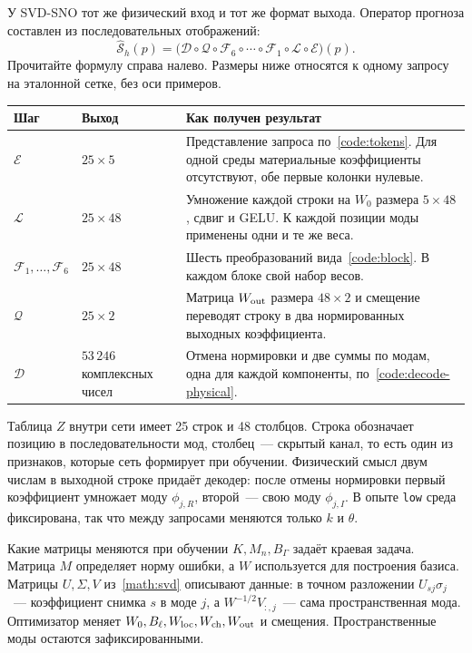 У SVD-SNO тот же физический вход и тот же формат выхода. Оператор прогноза
составлен из последовательных отображений:
\begin{equation}
 \widehat{\mathcal S}_h(p)=
 \bigl(\mathcal D\circ\mathcal Q\circ\mathcal F_6\circ\cdots
       \circ\mathcal F_1\circ\mathcal L\circ\mathcal E\bigr)(p).
 \label{code:whole-operator}
\end{equation}
Прочитайте формулу справа налево. Размеры ниже относятся к одному запросу
на эталонной сетке, без оси примеров.

\begin{center}
\renewcommand{\arraystretch}{1.17}
\begin{tabularx}{\linewidth}{@{}l l X@{}}
\toprule
Шаг & Выход & Как получен результат \\ \midrule
$\mathcal E$ & $25\times5$ & Представление запроса по~\eqref{code:tokens}.
Для одной среды материальные коэффициенты отсутствуют, обе первые колонки нулевые.\\
$\mathcal L$ & $25\times48$ & Умножение каждой строки на $W_0$ размера $5\times48$,
сдвиг и GELU. К каждой позиции моды применены одни и те же веса.\\
$\mathcal F_1,\ldots,\mathcal F_6$ & $25\times48$ & Шесть преобразований
вида~\eqref{code:block}. В каждом блоке свой набор весов.\\
$\mathcal Q$ & $25\times2$ & Матрица $W_{\rm out}$ размера $48\times2$ и смещение
переводят строку в два нормированных выходных коэффициента.\\
$\mathcal D$ & $53\,246$ комплексных чисел & Отмена нормировки и две суммы
по модам, одна для каждой компоненты, по~\eqref{code:decode-physical}.\\
\bottomrule
\end{tabularx}
\end{center}

Таблица $Z$ внутри сети имеет 25 строк и 48 столбцов. Строка обозначает
позицию в последовательности мод, столбец~--- скрытый канал, то есть один
из признаков, которые сеть формирует при обучении. Физический смысл двум числам в выходной строке придаёт декодер: после отмены
нормировки первый коэффициент умножает моду $\phi_{j,R}$, второй~---
свою моду $\phi_{j,I}$. В опыте \texttt{low} среда фиксирована,
так что между запросами меняются только $k$ и $\theta$.

\begin{idea}{Какие матрицы меняются при обучении}
$K,M_n,B_\Gamma$ задаёт краевая задача. Матрица $M$ определяет норму
ошибки, а $W$ используется для построения базиса. Матрицы
$U,\Sigma,V$ из~\eqref{math:svd} описывают данные: в точном разложении
$U_{sj}\sigma_j$~--- коэффициент снимка $s$ в моде $j$, а
$W^{-1/2}V_{:,j}$~--- сама пространственная мода.
Оптимизатор меняет $W_0,B_\ell,W_{\rm loc},W_{\rm ch},W_{\rm out}$
и смещения. Пространственные моды остаются зафиксированными.
\end{idea}

